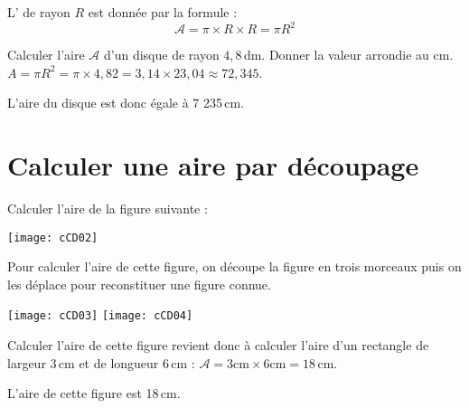\begin{propriete}
L' de rayon $R$ est donnée par la formule :
\[ \mathcal{A} = \pi \times R \times R = \pi R^2 \]
\end{propriete} 
 

\begin{exemple*1}
Calculer l'aire $\mathcal{A}$ d'un disque de rayon $4,8$\,dm. Donner la valeur arrondie au cm.
\correction
$A = \pi R^2 = \pi \times 4,82 = 3,14 \times 23,04 \approx 72,345$.

L'aire du disque est donc égale à 7 235\,cm. 
\end{exemple*1}




\section{Calculer une aire par découpage}


\begin{exemple*1}
Calculer l’aire de la figure suivante :

\begin{center}
    \texttt{[image: cCD02]}
\end{center}

\correction
Pour calculer l'aire de cette figure, on découpe la figure en trois morceaux puis on les déplace pour reconstituer une figure connue.

\begin{center}
    \hfill \texttt{[image: cCD03]} \hfill \texttt{[image: cCD04]} \hspace*{\fill}
\end{center}
						
Calculer l'aire de cette figure revient donc à calculer l'aire d'un rectangle de largeur 3\,cm et de longueur 6\,cm : $\mathcal{A} = 3 \text{cm} \times 6 \text{cm} = 18$\,cm.

L'aire de cette figure est 18\,cm.
\end{exemple*1}



